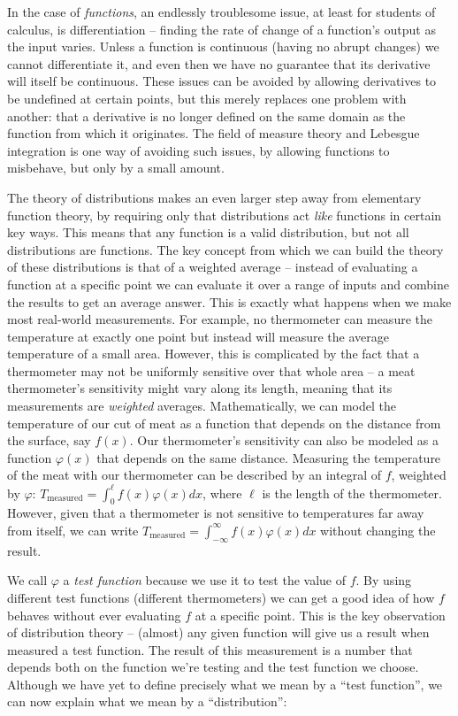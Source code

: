   In the case of \emph{functions}, an endlessly troublesome issue, at least for students of calculus, is differentiation -- finding the rate of change of a function's output as the input varies.
  Unless a function is continuous (having no abrupt changes) we cannot differentiate it, and even then we have no guarantee that its derivative will itself be continuous.
  These issues can be avoided by allowing derivatives to be undefined at certain points, but this merely replaces one problem with another: that a derivative is no longer defined on the same domain as the function from which it originates.
  The field of measure theory and Lebesgue integration is one way of avoiding such issues, by allowing functions to misbehave, but only by a small amount.

  The theory of distributions makes an even larger step away from elementary function theory, by requiring only that distributions act \emph{like} functions in certain key ways.
  This means that any function is a valid distribution, but not all distributions are functions.
  The key concept from which we can build the theory of these distributions is that of a weighted average -- instead of evaluating a function at a specific point we can evaluate it over a range of inputs and combine the results to get an average answer.
  This is exactly what happens when we make most real-world measurements.
  For example, no thermometer can measure the temperature at exactly one point but instead will measure the average temperature of a small area.
  However, this is complicated by the fact that a thermometer may not be uniformly sensitive over that whole area -- a meat thermometer's sensitivity might vary along its length, meaning that its measurements are \emph{weighted} averages. 
  Mathematically, we can model the temperature of our cut of meat as a function that depends on the distance from the surface, say $f(x)$.
  Our thermometer's sensitivity can also be modeled as a function $\varphi(x)$ that depends on the same distance.
  Measuring the temperature of the meat with our thermometer can be described by an integral of $f$, weighted by $\varphi$: $T_\text{measured} = \int_0^\ell f(x)\varphi(x) dx$, where $\ell$ is the length of the thermometer. %
  However, given that a thermometer is not sensitive to temperatures far away from itself, we can write $T_\text{measured} = \int_{-\infty}^{\infty} f(x)\varphi(x)dx$ without changing the result.

  We call $\varphi$ a \emph{test function} because we use it to test the value of $f$.
  By using different test functions (different thermometers) we can get a good idea of how $f$ behaves without ever evaluating $f$ at a specific point.
  This is the key observation of distribution theory -- (almost) any given function will give us a result when measured a test function.
  The result of this measurement is a number that depends both on the function we're testing and the test function we choose.
  Although we have yet to define precisely what we mean by a ``test function'', we can now explain what we mean by a ``distribution'':

